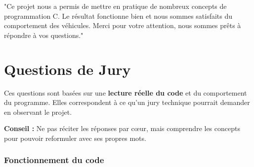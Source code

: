 \documentclass[11pt,a4paper]{article}
\begin{document}
\begin{phrasebox}
"Ce projet nous a permis de mettre en pratique de nombreux concepts de programmation C. Le résultat fonctionne bien et nous sommes satisfaits du comportement des véhicules. Merci pour votre attention, nous sommes prêts à répondre à vos questions."
\end{phrasebox}

\newpage

\part{Questions de Jury}

\begin{tcolorbox}[
    enhanced,
    colback=accent!5,
    colframe=accent,
    arc=5pt,
    boxrule=2pt,
    title={\color{white}\faIcon{exclamation-circle} Note importante},
    fonttitle=\bfseries,
    attach boxed title to top center={yshift=-3mm},
    boxed title style={colback=accent, arc=3pt}
]
Ces questions sont basées sur une \textbf{lecture réelle du code} et du comportement du programme. Elles correspondent à ce qu'un jury technique pourrait demander en observant le projet.

\textbf{Conseil :} Ne pas réciter les réponses par cœur, mais comprendre les concepts pour pouvoir reformuler avec ses propres mots.
\end{tcolorbox}

\vspace{0.5cm}

\section{Fonctionnement du code}

\begin{questionbox}
\end{questionbox}
\end{document}
